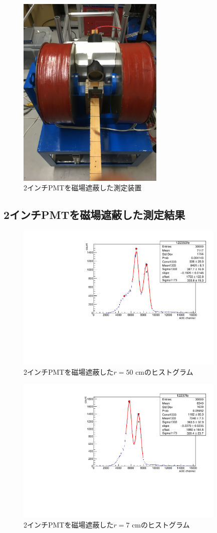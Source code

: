 \begin{figure}[tbp]
	\centering
		\includegraphics[width=7cm]{fig/iguchi/2inchinFe.jpg}
	\caption{2インチPMTを磁場遮蔽した測定装置}
	\label{2inchinFe}
\end{figure}


\subsection{2インチPMTを磁場遮蔽した測定結果}

\begin{figure}[tbp]
	\centering
		\includegraphics[clip,angle=-90,width=10cm]{fig/iguchi/122350fe.pdf}
	\caption{2インチPMTを磁場遮蔽した$r=50$ cmのヒストグラム}
	\label{hist50fe}
\end{figure}
\begin{figure}[tbp]
	\centering
		\includegraphics[clip,angle=-90,width=10cm]{fig/iguchi/12237fe.pdf}
	\caption{2インチPMTを磁場遮蔽した$r=7$ cmのヒストグラム}
	\label{hist7fe}
\end{figure}

